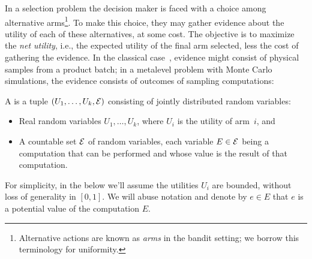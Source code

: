 




In a selection problem the decision maker is faced with a choice among
alternative arms\footnote{Alternative actions are known as \emph{arms} in the bandit setting;
we borrow this terminology for uniformity.}.  To make this choice, they may gather evidence about the
utility of each of these alternatives, at some cost.  The objective is to maximize
the {\em net utility}, i.e., the expected utility of the final arm selected, less the cost of gathering the evidence. 
In the classical case~\citep{Bechhofer:1954}, evidence might consist of physical samples
from a product batch; in a metalevel problem with Monte Carlo simulations,
the evidence consists of outcomes of sampling computations:

\begin{dfn} \label{dfn:metalevel-model}
	A  is a tuple $(U_1,\dots,U_k,\mathcal{E})$ 
	consisting of jointly distributed random variables:
	\begin{itemize}
		\item Real random variables $U_1,\dots,U_k$, where $U_i$ is the utility of arm~$i$, and
		\item A countable set $\mathcal{E}$ of random variables, each variable $E\in\mathcal{E}$ being 
		      a computation that can be performed and whose value is the result of that computation.
	\end{itemize}
\end{dfn}
For simplicity, in the below we'll assume the utilities $U_i$ are bounded, 
without loss of generality in $[0,1]$.  We will abuse notation and denote by $e\in E$ that $e$ is
a potential value of the computation $E$.

